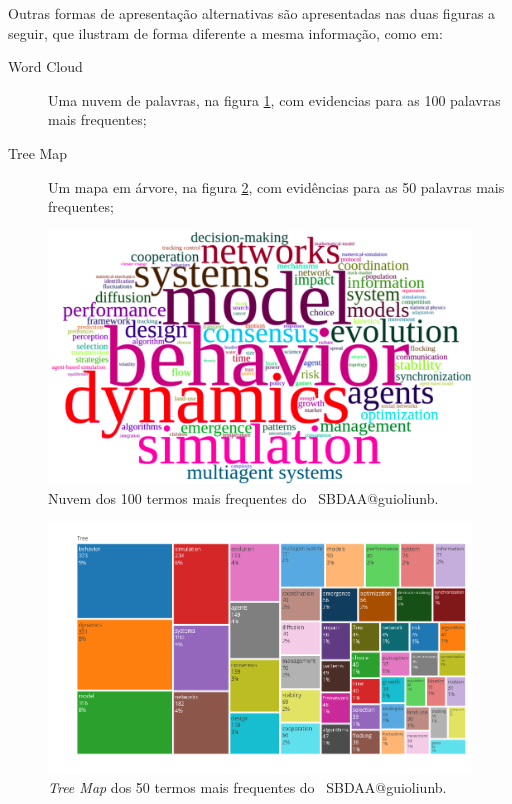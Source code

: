 Outras formas de apresentação alternativas são apresentadas nas duas figuras a seguir, que ilustram de forma diferente a mesma informação, como em:
\begin{description}
    \item [Word Cloud] Uma nuvem de palavras, na figura \ref{fig:MASSA2-WordCloud-100words}, com evidencias para as 100 palavras mais frequentes;
    \item [Tree Map] Um mapa em árvore, na figura \ref{fig:MASSA2-TreeMap}, com evidências para as 50 palavras mais frequentes;
\end{description}

\begin{figure}
    \centering
    \includegraphics[width=1\textwidth]{experiments/jhcf/PesqBibliogr/SimulacaoMultiagente/WoS-20220203/Metricas/Documentos/MASSA2-WordCloud-100words.png}
    \caption{Nuvem dos 100 termos mais frequentes do \dataset\ SBDAA@guioliunb.}
    \label{fig:MASSA2-WordCloud-100words}
\end{figure}

\begin{figure}
    \centering
    \includegraphics[width=1\textwidth]{experiments/jhcf/PesqBibliogr/SimulacaoMultiagente/WoS-20220203/Metricas/Documentos/MASSA2-TreeMap.png}
    \caption{\textit{Tree Map} dos 50 termos mais frequentes do \dataset\ SBDAA@guioliunb.}
    \label{fig:MASSA2-TreeMap}
\end{figure}

